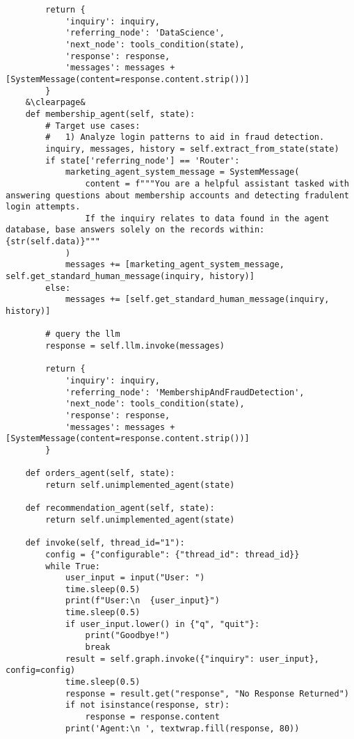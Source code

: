 \documentclass[11pt,letterpaper]{article}
\begin{document}
\begin{lstlisting}
        return {
            'inquiry': inquiry,
            'referring_node': 'DataScience',
            'next_node': tools_condition(state),
            'response': response,
            'messages': messages + [SystemMessage(content=response.content.strip())]
        }
    &\clearpage&
    def membership_agent(self, state):
        # Target use cases:
        #   1) Analyze login patterns to aid in fraud detection.
        inquiry, messages, history = self.extract_from_state(state)
        if state['referring_node'] == 'Router':
            marketing_agent_system_message = SystemMessage(
                content = f"""You are a helpful assistant tasked with answering questions about membership accounts and detecting fradulent login attempts.
                If the inquiry relates to data found in the agent database, base answers solely on the records within: {str(self.data)}"""
            )
            messages += [marketing_agent_system_message, self.get_standard_human_message(inquiry, history)]
        else:
            messages += [self.get_standard_human_message(inquiry, history)]

        # query the llm
        response = self.llm.invoke(messages)

        return {
            'inquiry': inquiry,
            'referring_node': 'MembershipAndFraudDetection',
            'next_node': tools_condition(state),
            'response': response,
            'messages': messages + [SystemMessage(content=response.content.strip())]
        }
    
    def orders_agent(self, state):
        return self.unimplemented_agent(state)
    
    def recommendation_agent(self, state):
        return self.unimplemented_agent(state)
    
    def invoke(self, thread_id="1"):
        config = {"configurable": {"thread_id": thread_id}}
        while True:
            user_input = input("User: ")
            time.sleep(0.5)
            print(f"User:\n  {user_input}")
            time.sleep(0.5)
            if user_input.lower() in {"q", "quit"}:
                print("Goodbye!")
                break
            result = self.graph.invoke({"inquiry": user_input}, config=config)
            time.sleep(0.5)
            response = result.get("response", "No Response Returned")
            if not isinstance(response, str):
                response = response.content
            print('Agent:\n ', textwrap.fill(response, 80))
\end{lstlisting}
\end{document}
